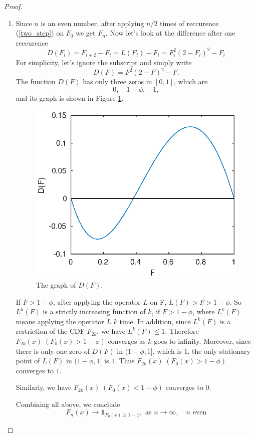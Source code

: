 \documentclass{article}
\begin{document}
\begin{spacing}{1.4}
\begin{proof}
  \begin{enumerate}
    \item Since $n$ is an even number, after applying $n/2$ times of reccurence (\ref{two_step}) on $F_0$ we get $F_n$. Now let's look at the difference after one reccurence
    \begin{equation}
      D(F_i) = F_{i+2} - F_i = L(F_i) - F_i = F_i^2 (2 - F_i)^2 - F_i
    \end{equation}
    For simplicity, let's ignore the subscript and simply write
    \begin{equation}
      D(F) = F^2 (2 - F)^2 - F.
    \end{equation}
    The function $D(F)$ has only three zeros in $[0, 1]$, which are
    \begin{equation}
      0, \quad 1 - \phi, \quad 1,
    \end{equation}
    and its graph is shown in Figure \ref{D_F}.
    \begin{figure}[!htb] \centering
      \includegraphics[width=0.4\columnwidth]{figures/D_F.eps}
      \caption{The graph of $D(F)$.}
      \label{D_F}
    \end{figure}

    If $F > 1 - \phi$, after applying the operator $L$ on F, $L(F) > F > 1 - \phi$. So $L^k (F)$ is a strictly increasing function of $k$, if $F > 1 - \phi$, where $L^k (F)$ means applying the operator $L$ $k$ time. In addition, since $L^k (F)$ is a restriction of the CDF $F_{2k}$, we have $L^k (F) \leq 1$. Therefore $F_{2k}(x) \; (F_0(x) > 1 - \phi)$ converges as $k$ goes to infinity.
    Moreover, since there is only one zero of $D(F)$ in $(1 - \phi, 1]$, which is $1$, the only stationary point of $L(F)$ in $(1 - \phi, 1]$ is $1$. Thus $F_{2k}(x) \; (F_0(x) > 1 - \phi)$ converges to $1$.

    Similarly, we have $F_{2k}(x) \; (F_0(x) < 1 - \phi)$ converges to $0$.

    Combining all above, we conclude
    \begin{equation}
      F_n(x) \to \mathds{1}_{F_0(x) \geq 1 - \phi}, \text{ as } n \to \infty, \quad \text{$n$ even}
    \end{equation}


\end{enumerate}
\end{proof}
\end{spacing}
\end{document}
